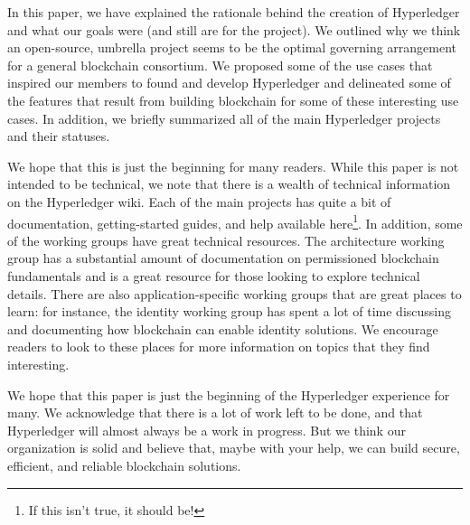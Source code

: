 In this paper, we have explained the rationale behind the creation of Hyperledger and what our goals were (and still are for the project).  We outlined why we think an open-source, umbrella project seems to be the optimal governing arrangement for a general blockchain consortium.  We proposed some of the use cases that inspired our members to found and develop Hyperledger and delineated some of the features that result from building blockchain for some of these interesting use cases.  In addition, we briefly summarized all of the main Hyperledger projects and their statuses.

We hope that this is just the beginning for many readers.  While this paper is not intended to be technical, we note that there is a wealth of technical information on the Hyperledger wiki.  Each of the main projects has quite a bit of documentation, getting-started guides, and help available here\footnote{If this isn't true, it should be!}.  In addition, some of the working groups have great technical resources.  The architecture working group has a substantial amount of documentation on permissioned blockchain fundamentals and is a great resource for those looking to explore technical details.  There are also application-specific working groups that are great places to learn: for instance, the identity working group has spent a lot of time discussing and documenting how blockchain can enable identity solutions.  We encourage readers to look to these places for more information on topics that they find interesting.   

We hope that this paper is just the beginning of the Hyperledger experience for many.  We acknowledge that there is a lot of work left to be done, and that Hyperledger will almost always be a work in progress.  But we think our organization is solid and believe that, maybe with your help, we can build secure, efficient, and reliable blockchain solutions.